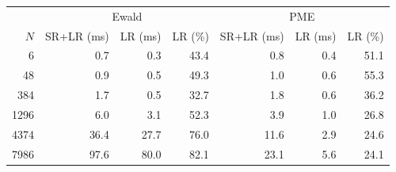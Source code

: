 \begin{tabular}{r | r r r | r r r}
\toprule
  \multicolumn{1}{c}{} & \multicolumn{3}{c}{Ewald} & \multicolumn{3}{c}{PME} \\ 
           $N$  &      SR+LR (ms)  &         LR (ms)  &         LR (\%)  &      SR+LR (ms)  &         LR (ms)  &         LR (\%) \\ 
\midrule
             6  &       \num{0.7}  &       \num{0.3}  &      \num{43.4}  &       \num{0.8}  &       \num{0.4}  &      \num{51.1} \\ 
            48  &       \num{0.9}  &       \num{0.5}  &      \num{49.3}  &       \num{1.0}  &       \num{0.6}  &      \num{55.3} \\ 
           384  &       \num{1.7}  &       \num{0.5}  &      \num{32.7}  &       \num{1.8}  &       \num{0.6}  &      \num{36.2} \\ 
          1296  &       \num{6.0}  &       \num{3.1}  &      \num{52.3}  &       \num{3.9}  &       \num{1.0}  &      \num{26.8} \\ 
          4374  &      \num{36.4}  &      \num{27.7}  &      \num{76.0}  &      \num{11.6}  &       \num{2.9}  &      \num{24.6} \\ 
          7986  &      \num{97.6}  &      \num{80.0}  &      \num{82.1}  &      \num{23.1}  &       \num{5.6}  &      \num{24.1} \\ 

\end{tabular}
